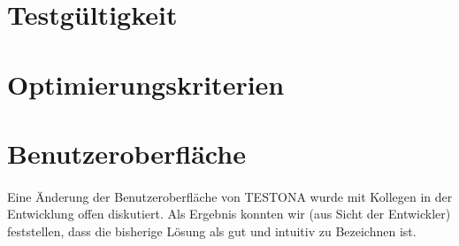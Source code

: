 \newpage
\section{Testgültigkeit}
\paragraph{}

\newpage
\section{Optimierungskriterien}
\paragraph{}

\newpage
\section{Benutzeroberfläche}
\paragraph{}



Eine Änderung der Benutzeroberfläche von TESTONA wurde mit Kollegen in der Entwicklung offen diskutiert. Als Ergebnis konnten wir (aus Sicht der Entwickler) feststellen, dass die bisherige Lösung als gut und intuitiv zu Bezeichnen ist.\\

